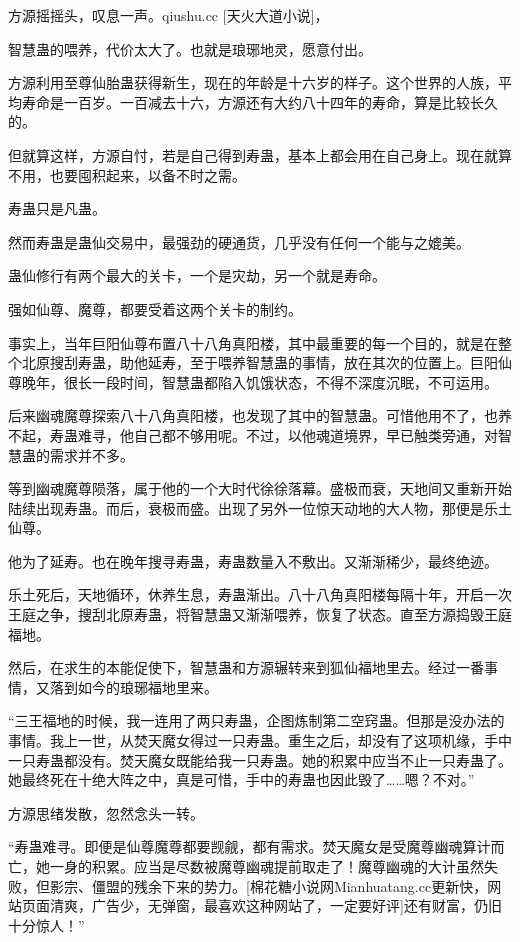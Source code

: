 
\begin{this_body}

方源摇摇头，叹息一声。qiushu.cc [天火大道小说]，

智慧蛊的喂养，代价太大了。也就是琅琊地灵，愿意付出。

方源利用至尊仙胎蛊获得新生，现在的年龄是十六岁的样子。这个世界的人族，平均寿命是一百岁。一百减去十六，方源还有大约八十四年的寿命，算是比较长久的。

但就算这样，方源自忖，若是自己得到寿蛊，基本上都会用在自己身上。现在就算不用，也要囤积起来，以备不时之需。

寿蛊只是凡蛊。

然而寿蛊是蛊仙交易中，最强劲的硬通货，几乎没有任何一个能与之媲美。

蛊仙修行有两个最大的关卡，一个是灾劫，另一个就是寿命。

强如仙尊、魔尊，都要受着这两个关卡的制约。

事实上，当年巨阳仙尊布置八十八角真阳楼，其中最重要的每一个目的，就是在整个北原搜刮寿蛊，助他延寿，至于喂养智慧蛊的事情，放在其次的位置上。巨阳仙尊晚年，很长一段时间，智慧蛊都陷入饥饿状态，不得不深度沉眠，不可运用。

后来幽魂魔尊探索八十八角真阳楼，也发现了其中的智慧蛊。可惜他用不了，也养不起，寿蛊难寻，他自己都不够用呢。不过，以他魂道境界，早已触类旁通，对智慧蛊的需求并不多。

等到幽魂魔尊陨落，属于他的一个大时代徐徐落幕。盛极而衰，天地间又重新开始陆续出现寿蛊。而后，衰极而盛。出现了另外一位惊天动地的大人物，那便是乐土仙尊。

他为了延寿。也在晚年搜寻寿蛊，寿蛊数量入不敷出。又渐渐稀少，最终绝迹。

乐土死后，天地循环，休养生息，寿蛊渐出。八十八角真阳楼每隔十年，开启一次王庭之争，搜刮北原寿蛊，将智慧蛊又渐渐喂养，恢复了状态。直至方源捣毁王庭福地。

然后，在求生的本能促使下，智慧蛊和方源辗转来到狐仙福地里去。经过一番事情，又落到如今的琅琊福地里来。

“三王福地的时候，我一连用了两只寿蛊，企图炼制第二空窍蛊。但那是没办法的事情。我上一世，从焚天魔女得过一只寿蛊。重生之后，却没有了这项机缘，手中一只寿蛊都没有。焚天魔女既能给我一只寿蛊。她的积累中应当不止一只寿蛊了。她最终死在十绝大阵之中，真是可惜，手中的寿蛊也因此毁了……嗯？不对。”

方源思绪发散，忽然念头一转。

“寿蛊难寻。即便是仙尊魔尊都要觊觎，都有需求。焚天魔女是受魔尊幽魂算计而亡，她一身的积累。应当是尽数被魔尊幽魂提前取走了！魔尊幽魂的大计虽然失败，但影宗、僵盟的残余下来的势力。[棉花糖小说网Mianhuatang.cc更新快，网站页面清爽，广告少，无弹窗，最喜欢这种网站了，一定要好评]还有财富，仍旧十分惊人！”


\end{this_body}
